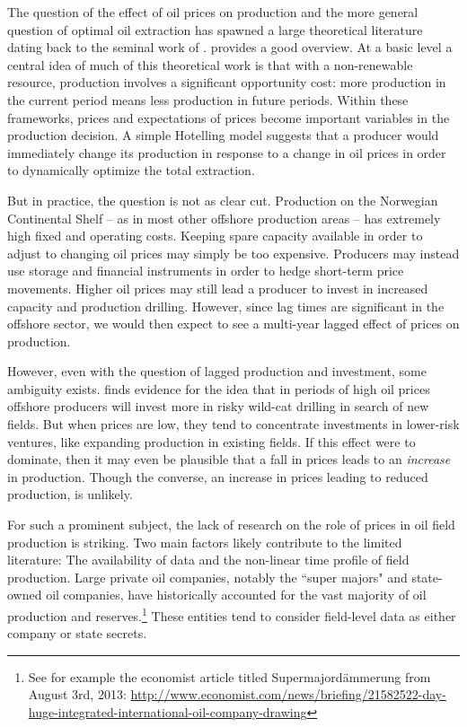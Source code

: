 \documentclass[12pt]{article}
\begin{document}
The question of the effect of oil prices on production and the more general question of optimal oil extraction has spawned a large theoretical literature dating back to the seminal work of \citet{hotelling_economics_1931}. \citet{krautkraemer_nonrenewable_1998} provides a good overview. At a basic level a central idea of much of this theoretical work is that with a non-renewable resource, production involves a significant opportunity cost: more production in the current period means less production in future periods.  Within these frameworks, prices and expectations of prices become important variables in the production decision. A simple Hotelling model suggests that a producer would immediately change its production in response to a change in oil prices in order to dynamically optimize the total extraction.

But in practice, the question is not as clear cut.  Production on the Norwegian Continental Shelf -- as in most other offshore production areas -- has extremely high fixed and operating costs.  Keeping spare capacity available in order to adjust to changing oil prices may simply be too expensive. Producers may instead use storage and financial instruments in order to hedge short-term price movements. Higher oil prices may still lead a producer to invest in increased capacity and production drilling. However, since lag times are significant in the offshore sector, we would then expect to see a multi-year lagged effect of prices on production. 

However, even with the question of lagged production and investment, some ambiguity exists.  \citet{mohn_efforts_2008} finds evidence for the idea that in periods of high oil prices offshore producers will invest more in risky wild-cat drilling in search of new fields. But when prices are low, they tend to concentrate investments in lower-risk ventures, like expanding production in existing fields. If this effect were to dominate, then it may even be plausible that a fall in prices leads to an \emph{increase} in production. Though the converse, an increase in prices leading to reduced production, is unlikely.  


For such a prominent subject, the lack of research on the role of prices in oil field production is striking. Two main factors likely contribute to the limited literature: The availability of data and the non-linear time profile of field production.  Large private oil companies, notably the ``super majors" and state-owned oil companies, have historically accounted for the vast majority of oil production and reserves.\footnote{See for example the economist article titled Supermajordämmerung from August 3rd, 2013: \url{http://www.economist.com/news/briefing/21582522-day-huge-integrated-international-oil-company-drawing}} These entities tend to consider field-level data as either company or state secrets.   
\end{document}
